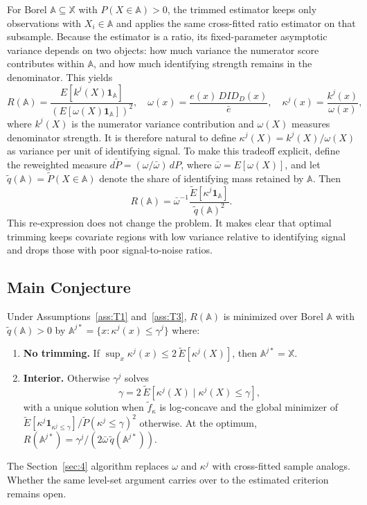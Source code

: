 For Borel $\mathbb A\subseteq\mathbb X$ with $P(X\in\mathbb A)>0$, the trimmed estimator keeps only observations with $X_i\in\mathbb A$ and applies the same cross-fitted ratio estimator on that subsample. Because the estimator is a ratio, its fixed-parameter asymptotic variance depends on two objects: how much variance the numerator score contributes within $\mathbb A$, and how much identifying strength remains in the denominator. This yields
\begin{equation}\label{eq:R_criterion_pop}
    R(\mathbb A)=\frac{E[k^j(X)\mathbf 1_{\mathbb A}]}{(E[\omega(X)\mathbf 1_{\mathbb A}])^2},
    \quad \omega(x)=\frac{e(x)\,DID_D(x)}{\bar e},
    \quad \kappa^j(x)=\frac{k^j(x)}{\omega(x)},
\end{equation}
where $k^j(X)$ is the numerator variance contribution and $\omega(X)$ measures denominator strength. It is therefore natural to define $\kappa^j(X)=k^j(X)/\omega(X)$ as variance per unit of identifying signal. To make this tradeoff explicit, define the reweighted measure $d\tilde P=(\omega/\bar\omega)\,dP$, where $\bar\omega=E[\omega(X)]$, and let $\tilde q(\mathbb A)=\tilde P(X\in\mathbb A)$ denote the share of identifying mass retained by $\mathbb A$. Then
\[
R(\mathbb A)=\bar\omega^{-1}\frac{\tilde E[\kappa^j\mathbf 1_{\mathbb A}]}{\tilde q(\mathbb A)^2}.
\]
This re-expression does not change the problem. It makes clear that optimal trimming keeps covariate regions with low variance relative to identifying signal and drops those with poor signal-to-noise ratios.

\subsection{Main Conjecture}

\begin{conjecture}\label{thm:trim}
Under Assumptions~\ref{ass:T1} and~\ref{ass:T3}, $R(\mathbb A)$ is minimized over Borel $\mathbb A$ with $\tilde q(\mathbb A)>0$ by $\mathbb A^{j*}=\{x:\kappa^j(x)\le\gamma^j\}$ where:
\begin{enumerate}
    \item[\textup{(i)}] \textbf{No trimming.} If $\sup_x\kappa^j(x)\le 2\,\tilde E[\kappa^j(X)]$, then $\mathbb A^{j*}=\mathbb X$.
    \item[\textup{(ii)}] \textbf{Interior.} Otherwise $\gamma^j$ solves
    \begin{equation}\label{eq:FOC}
        \gamma=2\,\tilde E[\kappa^j(X)\mid \kappa^j(X)\le\gamma],
    \end{equation}
    with a unique solution when $\tilde f_\kappa$ is log-concave and the global minimizer of $\tilde E[\kappa^j\mathbf 1_{\kappa^j\le\gamma}]/\tilde P(\kappa^j\le\gamma)^2$ otherwise. At the optimum, $R(\mathbb A^{j*})=\gamma^j/(2\bar\omega\,\tilde q(\mathbb A^{j*}))$.
\end{enumerate}
The Section~\ref{sec:4} algorithm replaces $\omega$ and $\kappa^j$ with cross-fitted sample analogs. Whether the same level-set argument carries over to the estimated criterion remains open.
\end{conjecture}

